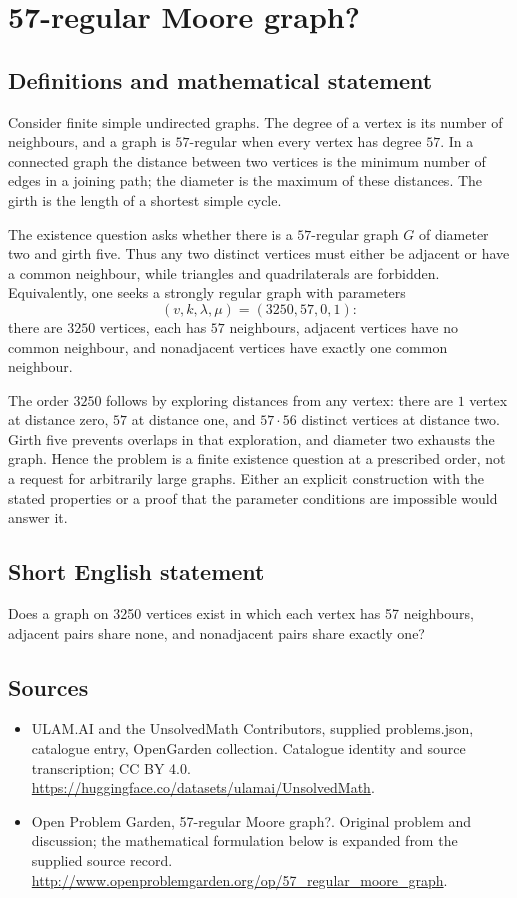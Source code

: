 \documentclass[11pt,a4paper]{article}
\begin{document}
\section*{57-regular Moore graph?}\label{statement}

\subsection{Definitions and mathematical statement}
Consider finite simple undirected graphs. The degree of a vertex is
its number of neighbours, and a graph is $57$-regular when every
vertex has degree $57$. In a connected graph the distance between
two vertices is the minimum number of edges in a joining path;
the diameter is the maximum of these distances. The girth is the
length of a shortest simple cycle.

The existence question asks whether there is a $57$-regular graph
$G$ of diameter two and girth five. Thus any two distinct vertices
must either be adjacent or have a common neighbour, while triangles
and quadrilaterals are forbidden. Equivalently, one seeks a strongly
regular graph with parameters
\[
 (v,k,\lambda,\mu)=(3250,57,0,1):
\]
there are $3250$ vertices, each has $57$ neighbours, adjacent
vertices have no common neighbour, and nonadjacent vertices have
exactly one common neighbour.

The order $3250$ follows by exploring distances from any vertex:
there are $1$ vertex at distance zero, $57$ at distance one, and
$57\cdot56$ distinct vertices at distance two. Girth five prevents
overlaps in that exploration, and diameter two exhausts the graph.
Hence the problem is a finite existence question at a prescribed
order, not a request for arbitrarily large graphs. Either an
explicit construction with the stated properties or a proof that
the parameter conditions are impossible would answer it.
\subsection{Short English statement}
Does a graph on 3250 vertices exist in which each vertex has 57 neighbours, adjacent pairs share none, and nonadjacent pairs share exactly one?
\subsection{Sources}
\begin{itemize}
\item[S1] ULAM.AI and the UnsolvedMath Contributors, supplied problems.json, catalogue entry, OpenGarden collection. Catalogue identity and source transcription; CC BY 4.0.
\url{https://huggingface.co/datasets/ulamai/UnsolvedMath}.
\item[S2] Open Problem Garden, 57-regular Moore graph?. Original problem and discussion; the mathematical formulation below is expanded from the supplied source record.
\url{http://www.openproblemgarden.org/op/57_regular_moore_graph}.
\end{itemize}
\end{document}
